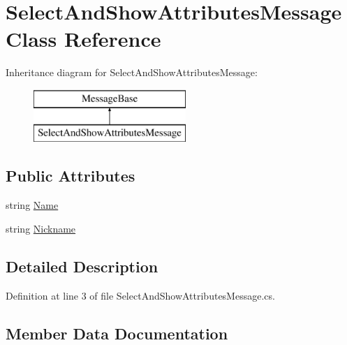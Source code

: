 \hypertarget{class_select_and_show_attributes_message}{}\section{Select\+And\+Show\+Attributes\+Message Class Reference}
\label{class_select_and_show_attributes_message}
Inheritance diagram for Select\+And\+Show\+Attributes\+Message\+:\begin{figure}[H]
\begin{center}
\leavevmode
\includegraphics[height=2.000000cm]{class_select_and_show_attributes_message}
\end{center}
\end{figure}
\subsection*{Public Attributes}
\begin{DoxyCompactItemize}
\item 
string \mbox{\hyperlink{class_select_and_show_attributes_message_ab6c7aee8b06c630af49e259739d6bd2b}{Name}}
\item 
string \mbox{\hyperlink{class_select_and_show_attributes_message_ad52a961dedef874b0dd19e6b5b2a9d97}{Nickname}}
\end{DoxyCompactItemize}


\subsection{Detailed Description}


Definition at line 3 of file Select\+And\+Show\+Attributes\+Message.\+cs.



\subsection{Member Data Documentation}
\mbox{\label{class_select_and_show_attributes_message_ab6c7aee8b06c630af49e259739d6bd2b}} 
